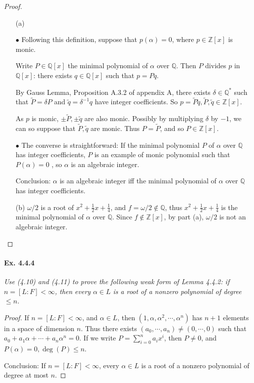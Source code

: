 \documentclass[11pt,a4paper]{article}
\newcommand{\Q}{\mathbb{Q}}
\newcommand{\Z}{\mathbb{Z}}
\begin{document}
\begin{proof}
\begin{enumerate}
\item[(a)]

$\bullet$ Following this definition, suppose that $p(\alpha) = 0$, where $p\in \mathbb{Z}[x]$ is monic.

Write $P\in \Q[x]$ the minimal polynomial of $\alpha$ over $\Q$. Then $P$ divides $p$ in $\Q[x]$: there exists $q \in \Q[x]$ such that $p = P q$.

By Gauss Lemma, Proposition A.3.2 of appendix A, there exists $\delta \in \mathbb{\Q}^*$ such that $\tilde{P} =\delta P$ and $\tilde{q} = \delta^{-1} q$ have integer coefficients. So $p = \tilde{P} \tilde{q}, \tilde{P}, \tilde{q} \in \Z[x]$.

As $p$ is monic, $\pm \tilde{P},\pm \tilde{q}$ are also monic. Possibly by multiplying  $\delta$ by $-1$, we can so suppose that $ \tilde{P}, \tilde{q}$ are monic. Thus $P = \tilde{P}$, and so $P \in \mathbb{Z}[x]$.

$\bullet$ The converse is straightforward: If the minimal polynomial $P$ of $\alpha$ over $\Q$ has integer coefficients, $P$ is an example of monic polynomial such that $P(\alpha) = 0$ , so $\alpha$ is an algebraic integer.

Conclusion:  $\alpha$ is an algebraic integer iff the minimal polynomial of $\alpha$ over $\Q$ has integer coefficients.


\item[(b)]
$\omega/2$ is a root of $  x^2 +\frac{1}{2}x + \frac{1}{4}$, and $f = \omega /2 \not \in \mathbb{Q}$, thus $  x^2 +\frac{1}{2}x + \frac{1}{4}$ is the minimal polynomial of $\alpha$ over $\Q$. Since $f \not \in \Z[x]$, by part (a), $\omega/2$ is not an algebraic integer.

\end{enumerate}
\end{proof}

\paragraph{Ex. 4.4.4}

{\it Use (4.10) and (4.11) to prove the following weak form of Lemma 4.4.2: if $n = [L:F] < \infty$, then every $\alpha \in L$ is a root of a nonzero polynomial of degree $\leq n$.
}

\begin{proof}
If $n = [L:F] < \infty$, and $\alpha \in L$, then $(1, \alpha,\alpha^2, \cdots,\alpha^n)$ has $n+1$ elements in a space of dimension $n$.
Thus there exists $(a_0,\cdots,a_n) \neq (0,\cdots,0)$ such that $a_0 + a_1\alpha+\cdots+a_n \alpha^n = 0$. If we write $P = \sum_{i=0}^n a_ix^i$, then $P\neq 0$, and $P(\alpha) = 0, \deg(P)\leq n$.

Conclusion: If $n = [L:F] < \infty$, every $\alpha \in L$ is a root of a nonzero polynomial of degree at most $n$.

\end{proof}
\end{document}
